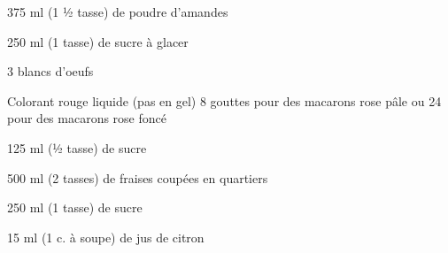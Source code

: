 


\totaltime{}


\begin{ingredients}
    \item[] 
    \item 375 ml (1 ½ tasse) de poudre d’amandes
    \item 250 ml (1 tasse) de sucre à glacer
    \item 3 blancs d’oeufs
    \item Colorant rouge liquide (pas en gel) 8 gouttes pour des macarons rose pâle ou 24 pour des macarons rose foncé
    \item 125 ml (½ tasse) de sucre
    \\
    \item[] 
    \item 500 ml (2 tasses) de fraises coupées en quartiers
    \item 250 ml (1 tasse) de sucre
    \item 15 ml (1 c. à soupe) de jus de citron
\end{ingredients}

